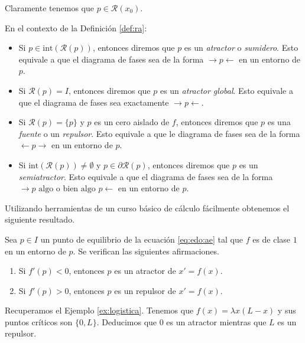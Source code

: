 \documentclass{article}
\begin{document}
Claramente tenemos que $p \in \mathcal{R}(x_0)$.

\begin{definition}
  \label{def:atractor}
  En el contexto de la Definición \ref{def:ra}:
  \begin{itemize}
  \item Si $p \in \mathrm{int}(\mathcal{R}(p))$, entonces diremos que $p$ es un \emph{atractor} o
    \emph{sumidero}. Esto equivale a que el diagrama de fases sea de la forma
    $\rightarrow p \leftarrow$ en un entorno de $p$.
  \item Si $\mathcal{R}(p) = I$, entonces diremos que $p$ es un \emph{atractor global}. Esto
    equivale a que el diagrama de fases sea exactamente $\rightarrow p \leftarrow$.
  \item Si $\mathcal{R}(p) = \{p\}$ y $p$ es un cero aislado de $f$, entonces diremos que $p$ es una
    \emph{fuente} o un \emph{repulsor}. Esto equivale a que le diagrama de fases sea de la forma
    $\leftarrow p \rightarrow$ en un entorno de $p$.
  \item Si $\mathrm{int}(\mathcal{R}(p)) \ne \emptyset$ y $p \in \partial \mathcal{R}(p)$, entonces
    diremos que $p$ es un \emph{semiatractor}. Esto equivale a que el diagrama de fases sea de la
    forma $\rightarrow p \text{ algo}$ o bien $\text{algo } p \leftarrow$ en un entorno de $p$.
  \end{itemize}
\end{definition}

Utilizando herramientas de un curso básico de cálculo fácilmente obtenemos el siguiente resultado.

\begin{prop}
  Sea $p \in I$ un punto de equilibrio de la ecuación \eqref{eq:edo:ae} tal que $f$ es de clase $1$
  en un entorno de $p$. Se verifican las siguientes afirmaciones.
  \begin{enumerate}
  \item Si $f'(p) < 0$, entonces $p$ es un atractor de $x' = f(x)$.
  \item Si $f'(p) > 0$, entonces $p$ es un repulsor de $x' = f(x)$.
  \end{enumerate}
\end{prop}

\begin{ex}
  Recuperamos el Ejemplo \ref{ex:logistica}. Tenemos que $f(x) = \lambda x(L-x)$ y sus puntos
  críticos son $\{0, L\}$. Deducimos que $0$ es un atractor mientras que $L$ es un repulsor.
\end{ex}
\end{document}
